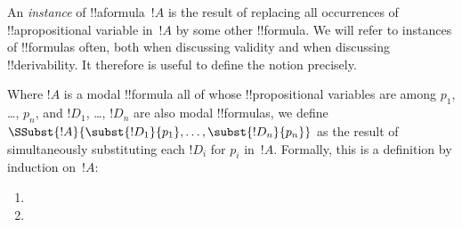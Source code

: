 \documentclass[../../../include/open-logic-section]{subfiles}
\begin{document}


An \emph{instance} of !!a{formula}~$!A$ is the result of replacing all
occurrences of !!a{propositional variable} in~$!A$ by some other
!!{formula}. We will refer to instances of !!{formula}s often, both
when discussing validity and when discussing !!{derivability}. It
therefore is useful to define the notion precisely.

\begin{defn}
  Where $!A$ is a modal !!{formula} all of whose !!{propositional
    variable}s are among $p_1$, \dots, $p_n$, and $!D_1$, \dots,
  $!D_n$ are also modal !!{formula}s, we define
  $\SSubst{!A}{\subst{!D_1}{p_1}, \dots, \subst{!D_n}{p_n}}$ as the
  result of simultaneously substituting each $!D_i$ for $p_i$
  in~$!A$. Formally, this is a definition by induction on~$!A$:
  \begin{enumerate}
    \item {}
    \item {}
\end{enumerate}
\end{defn}
\end{document}
